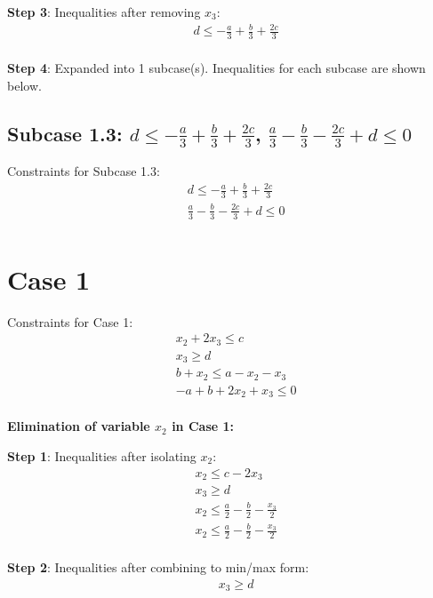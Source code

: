 \documentclass{article}
\begin{document}
\textbf{Step 3}: Inequalities after removing $x_{3}$:
\begin{align}
& d \leq - \frac{a}{3} + \frac{b}{3} + \frac{2 c}{3} \\
\end{align}

\textbf{Step 4}: Expanded into 1 subcase(s). Inequalities for each subcase are shown below.

\subsection{Subcase 1.3: $d \leq - \frac{a}{3} + \frac{b}{3} + \frac{2 c}{3}$, $\frac{a}{3} - \frac{b}{3} - \frac{2 c}{3} + d \leq 0$}

Constraints for Subcase 1.3:
\begin{align}
& d \leq - \frac{a}{3} + \frac{b}{3} + \frac{2 c}{3} \\
& \frac{a}{3} - \frac{b}{3} - \frac{2 c}{3} + d \leq 0 \\
\end{align}

\section{Case 1}

Constraints for Case 1:
\begin{align}
& x_{2} + 2 x_{3} \leq c \\
& x_{3} \geq d \\
& b + x_{2} \leq a - x_{2} - x_{3} \\
& - a + b + 2 x_{2} + x_{3} \leq 0 \\
\end{align}

\textbf{Elimination of variable $x_{2}$ in Case 1:}

\textbf{Step 1}: Inequalities after isolating $x_{2}$:
\begin{align}
& x_{2} \leq c - 2 x_{3} \\
& x_{3} \geq d \\
& x_{2} \leq \frac{a}{2} - \frac{b}{2} - \frac{x_{3}}{2} \\
& x_{2} \leq \frac{a}{2} - \frac{b}{2} - \frac{x_{3}}{2} \\
\end{align}

\textbf{Step 2}: Inequalities after combining to min/max form:
\begin{align}
& x_{3} \geq d \\
\end{align}
\end{document}
